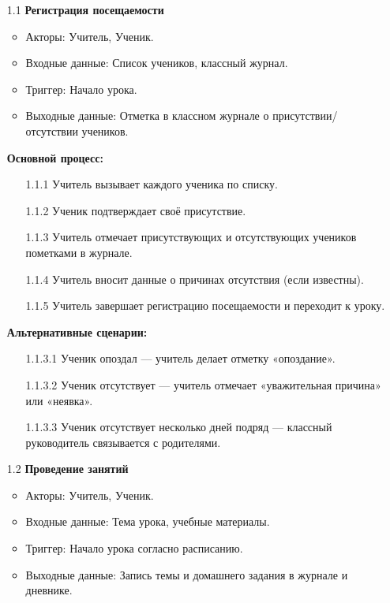 \documentclass[a4paper, final]{article}
\begin{document}
\begin{enumerate}
  \item[1.1] \textbf{Регистрация посещаемости}
  \begin{itemize}
    \item Акторы: Учитель, Ученик.
    \item Входные данные: Список учеников, классный журнал.
    \item Триггер: Начало урока.
    \item Выходные данные: Отметка в классном журнале о присутствии/отсутствии учеников.
  \end{itemize}

  \textbf{Основной процесс:}
  \begin{enumerate}
    \item[1.1.1] Учитель вызывает каждого ученика по списку.
    \item[1.1.2] Ученик подтверждает своё присутствие.
    \item[1.1.3] Учитель отмечает присутствующих и отсутствующих учеников пометками в журнале.
    \item[1.1.4] Учитель вносит данные о причинах отсутствия (если известны).
    \item[1.1.5] Учитель завершает регистрацию посещаемости и переходит к уроку.
  \end{enumerate}
  
  \textbf{Альтернативные сценарии:}
  \begin{itemize}
    \item[1.1.3.1] Ученик опоздал --- учитель делает отметку «опоздание».
    \item[1.1.3.2] Ученик отсутствует --- учитель отмечает «уважительная причина» или «неявка».
    \item[1.1.3.3] Ученик отсутствует несколько дней подряд --- классный руководитель связывается с родителями.
  \end{itemize}
 
  \item[1.2] \textbf{Проведение занятий}
  \begin{itemize}
    \item Акторы: Учитель, Ученик.
    \item Входные данные: Тема урока, учебные материалы.
    \item Триггер: Начало урока согласно расписанию.
    \item Выходные данные: Запись темы и домашнего задания в журнале и дневнике.
  \end{itemize}


\end{enumerate}
\end{document}
